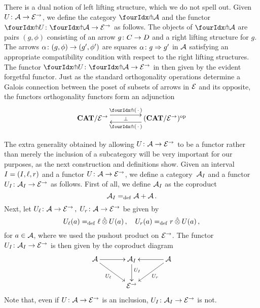 \documentclass[reqno,10pt,a4paper,oneside]{amsart}
\begin{document}
There is a dual notion of left lifting structure, which we do not spell out. Given $U \co \cal{A} \to \catE^\to$, we define the category $\liftr{\cal{A}}$ and the functor   $\liftr{U} \co \liftr{\cal{A}} \to \catE^\to$ as follows. The objects of
$ \liftr{\cal{A}}$ are pairs $(g, \phi)$ consisting of an arrow $g \co C \to D$ and a right lifting structure for $g$.
The arrows $\alpha \co (g, \phi) \to (g', \phi')$ are squares $\alpha \co g \Rightarrow g'$ in $\cal{A}$ satisfying an appropriate compatibility condition with respect to the right lifting structures. The functor $\liftr{U} \co \liftr{\cal{A}} \to \catE^\to$ in then given by the evident forgetful functor.  Just as the standard orthogonality operations determine a Galois connection between the poset of subsets of arrows in $\catE$ and its opposite, the functors orthogonality functors form an adjunction 
\begin{equation}
\label{garner-adjunction}
\begin{gathered}
\xymatrix@C+2em{
  \CAT/\catE^{\to}
  \ar@<5pt>[r]^-{\liftl{\brarghole}}
  \ar@{}[r]|-{\bot}
&
  (\CAT/\catE^{\to})^{\op}
  \ar@<5pt>[l]^-{\liftr{\brarghole}}
}
\end{gathered}
\end{equation}

The extra generality obtained by allowing $U \co \cal{A} \to \catE^\to$ to be a functor rather than merely the 
inclusion of a  subcategory will be very important for our purposes, as the next construction and definitions
show. Given an interval $\interval = (\interval, \intervall, \intervalr)$ and a functor $U \co \cal{A} \to \catE^\to$,
we define a category~$\cal{A}_\interval$ and a functor $U_\interval \co \cal{A}_\interval \to \catE^\to$ as follows. First of all, we define $\cal{A}_\interval$ as the coproduct
 \[
 \cal{A}_\interval  \defeq \cal{A} + \cal{A} \, .
 \] 
 Next, let $U_\intervall \co \cal{A} \to \catE^\to \, , \; U_\intervalr \co \cal{A} \to \catE^\to$ be given by
 \[
U_\intervall(a) \defeq  \intervall \hatotimes U(a) \, , \quad
U_\intervalr(a) \defeq  \intervalr \hatotimes U(a) \, , 
\]
for $a \in \cal{A}$, where we used the pushout product on $\catE^\to$. The functor $U_\interval \co \cal{A}_\interval \to \catE^\to$ is then given by the coproduct diagram
\[
\xymatrix@C=1.2cm{
\cal{A} \ar[r] \ar[dr]_-{U_\intervall} & \cal{A}_\interval \ar[d]^(.4){U_\interval} & \cal{A} \ar[dl]^-{U_\intervalr} \ar[l] \\ 
 & \catE^\to }
\]
Note that, even if $U \co \cal{A} \to \catE^\to$ is an inclusion, $U_\interval \co \cal{A}_\interval \to \catE^\to$ is not.
\end{document}
